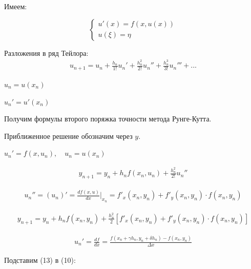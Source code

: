 \documentclass[a4paper,14pt]{article}
\begin{document}
Имеем:

\begin{equation}
	\begin{cases}
		u'(x) = f(x, u(x)) \\
		u(\xi) = \eta 
	\end{cases}
\end{equation}

\begin{figure}[!h]
	\label{fig:rk2}
\end{figure}

Разложения в ряд Тейлора:
\begin{eqnarray}
	u_{n+1} = u_n + \frac{h_n}{1!} u_n' + \frac{h_n^2}{2!} u_n'' + \frac{h_n^3}{3!}u_n''' + ...
\end{eqnarray}

$u_n = u(x_n)$

$u_n' = u'(x_n)$

Получим формулы второго поряжка точности метода Рунге-Кутта.

Приближенное решение обозначим через $y$.

$u_n' = f(x, u_n), \, \, \, \, \, \, u_n = u(x_n)$

\begin{eqnarray}
	y_{n+1} = y_n + h_n f(x_n, u_n) + \frac{h_n^2}{2!} u_n''
\end{eqnarray}

\begin{eqnarray}
	u_n'' = (u_n)' = \frac{df(x, u)}{dx} \bigg|_{x_n} = f'_x (x_n, y_n) + f'_y (x_n, y_n) \cdot f(x_n, y_n)
\end{eqnarray}

\begin{eqnarray}
	y_{n+1} = y_n + h_n f(x_n, y_n) + \frac{h_n^2}{2} \left[ f'_x (x_n, y_n) + f'_y (x_n, y_n) \cdot f(x_n, y_n) \right]
\end{eqnarray}

\begin{eqnarray}
	u_n' = \frac{df}{dx} = \frac{f(x_n + \gamma h_n, y_n + \delta h_n) - f(x_n, y_n)}{\Delta x}
\end{eqnarray}

Подставим (13) в (10):
\end{document}
